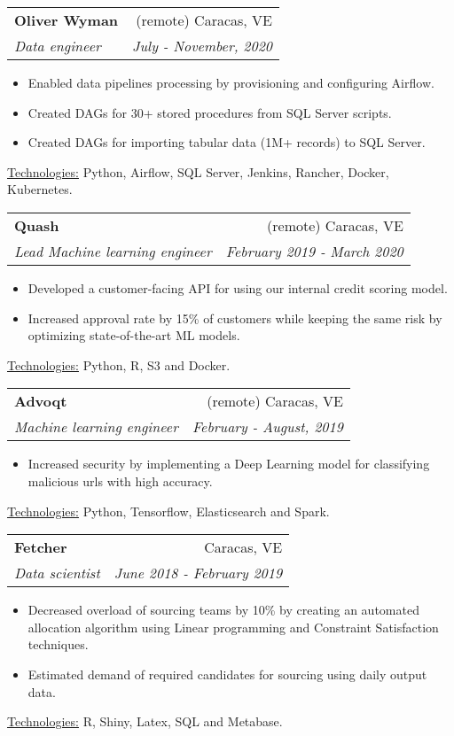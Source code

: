 \documentclass[letterpaper,11pt]{article}
\makeatletter
\newcommand{\sepsection}{\vspace{25pt}}
\newcommand{\resumeItem}[1]{%
  \item\small{
    #1
  }
}
\newcommand{\resumeSubheading}[4]{
  \vspace{8pt}\item%
    \begin{tabular*}{0.97\textwidth}[t]{l@{\extracolsep{\fill}}r}
      \textbf{#1} & #2 \\
      \textit{\small#3} & \textit{\small #4} \\
    \end{tabular*}\vspace{-5pt}
}
\newcommand{\resumeItemListStart}{\begin{itemize}}
\newcommand{\resumeItemListEnd}{\end{itemize}\vspace{-5pt}}
\newcommand{\resumeTech}[2]{
 \underline{#1:} #2
}
\makeatother
\begin{document}
\sepsection
    \resumeSubheading
      {Oliver Wyman}{(remote) Caracas, VE}
      {Data engineer}{July - November, 2020}
      \resumeItemListStart
      \resumeItem{Enabled data pipelines processing by provisioning and configuring Airflow.}
      \resumeItem{Created DAGs for 30+ stored procedures from SQL Server scripts.}
      \resumeItem{Created DAGs for importing tabular data (1M+ records) to SQL Server.}
      \resumeItemListEnd
      \resumeTech{Technologies}{Python, Airflow, SQL Server, Jenkins, Rancher, Docker, Kubernetes.}\\

    \sepsection

    \resumeSubheading
      {Quash}{(remote) Caracas, VE}
      {Lead Machine learning engineer}{February 2019 - March 2020}
      \resumeItemListStart
      \resumeItem{Developed a customer-facing API for using our internal credit scoring model.}
      \resumeItem{Increased approval rate by 15\% of customers while keeping the same risk by optimizing state-of-the-art ML models.}
      \resumeItemListEnd
      \resumeTech{Technologies}{Python, R, S3 and Docker.}\\

    \sepsection
    \newpage
    
    \resumeSubheading
      {Advoqt}{(remote) Caracas, VE}
      {Machine learning engineer}{February - August, 2019}
      \resumeItemListStart
      \resumeItem{Increased security by implementing a Deep Learning model for classifying malicious urls with high accuracy.}
      \resumeItemListEnd
      \resumeTech{Technologies}{Python, Tensorflow, Elasticsearch and Spark.}\\

    \sepsection
    \resumeSubheading
      {Fetcher}{Caracas, VE}
      {Data scientist}{June 2018 - February 2019}
      \resumeItemListStart
      \resumeItem{Decreased overload of sourcing teams by 10\% by creating an automated allocation algorithm using Linear programming and Constraint Satisfaction techniques.}
      \resumeItem{Estimated demand of required candidates for sourcing using daily output data.}
      \resumeItemListEnd
      \resumeTech{Technologies}{R, Shiny, Latex, SQL and Metabase.}\\
\end{document}
